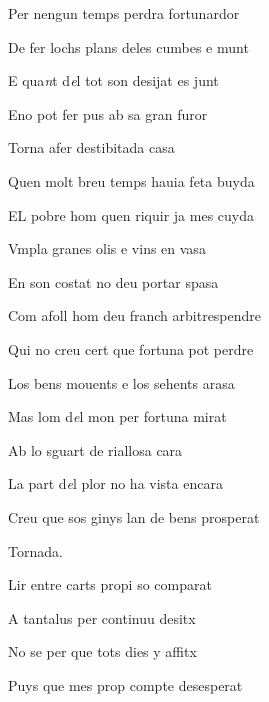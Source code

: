 \documentclass[12pt]{article}
\begin{document}
\begin{estrofa}

 Per nengun temps perdra fortunardor

 De fer lochs plans deles cumbes e munt

 E qua\textit{n}t d\textit{e}l tot son desijat es junt

 Eno pot fer pus ab sa gran furor

 Torna afer destibitada casa

 Quen molt breu temps hauia feta buyda

 EL pobre hom quen riquir ja mes cuyda

 Vmpla granes olis e vins en vasa

\end{estrofa}



\begin{estrofa}

 En son costat no deu portar spasa

 Com afoll hom deu franch arbitrespendre

 Qui no creu cert que fortuna pot perdre

 Los bens mouents e los sehents arasa

 Mas lom d\textit{e}l mon per fortuna mirat

 Ab lo sguart de riallosa cara

 La part d\textit{e}l plor no ha vista encara

 Creu que sos ginys lan de bens prosperat

\end{estrofa}


\begin{estrofaExtra}%




\begin{tornada}

Tornada.\barraInclinada 

\end{tornada}


\end{estrofaExtra}


\begin{estrofa}

 Lir entre carts propi so comparat

 A tantalus per continuu desitx

 No se per que tots dies y affitx

 Puys que mes prop compte desesperat

\end{estrofa}
\end{document}
